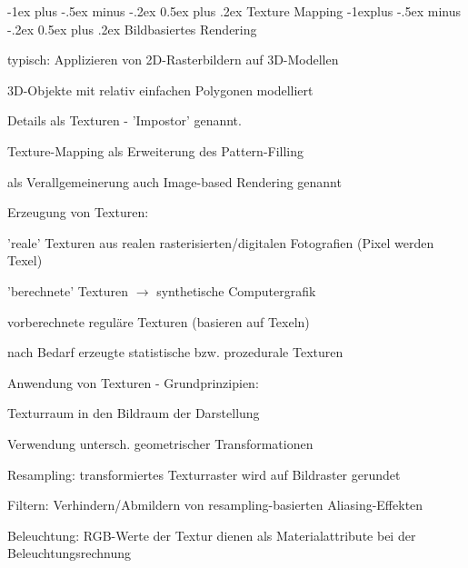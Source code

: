 \documentclass[landscape]{article}
\makeatletter
\renewcommand{\section}{\@startsection{section}{1}{0mm}%
                                {-1ex plus -.5ex minus -.2ex}%
                                {0.5ex plus .2ex}%
                                {\normalfont\large\bfseries}}
\renewcommand{\subsection}{\@startsection{subsection}{2}{0mm}%
                                {-1explus -.5ex minus -.2ex}%
                                {0.5ex plus .2ex}%
                                {\normalfont\normalsize\bfseries}}
\makeatother
\begin{document}
\begin{multicols}{3}
  \section{Texture Mapping}
  \subsection{Bildbasiertes Rendering}
  \begin{itemize*}
    \item typisch: Applizieren von 2D-Rasterbildern auf 3D-Modellen
    \item 3D-Objekte mit relativ einfachen Polygonen modelliert
    \item Details als Texturen - 'Impostor' genannt.
    \item Texture-Mapping als Erweiterung des Pattern-Filling
    \item als Verallgemeinerung auch Image-based Rendering genannt
  \end{itemize*}
  
  Erzeugung von Texturen:
  \begin{itemize*}
    \item 'reale' Texturen aus realen rasterisierten/digitalen Fotografien (Pixel werden Texel)
    \item 'berechnete' Texturen $\rightarrow$ synthetische Computergrafik
    \item vorberechnete reguläre Texturen (basieren auf Texeln) 
    \item nach Bedarf erzeugte statistische bzw. prozedurale Texturen
  \end{itemize*}
  
  Anwendung von Texturen - Grundprinzipien:
  \begin{itemize*}
    \item Texturraum in den Bildraum der Darstellung
    \item Verwendung untersch. geometrischer Transformationen
    \item Resampling: transformiertes Texturraster wird auf Bildraster gerundet
    \item Filtern: Verhindern/Abmildern von resampling-basierten Aliasing-Effekten
    \item Beleuchtung: RGB-Werte der Textur dienen als Materialattribute bei der Beleuchtungsrechnung
  \end{itemize*}
  

\end{multicols}
\end{document}

